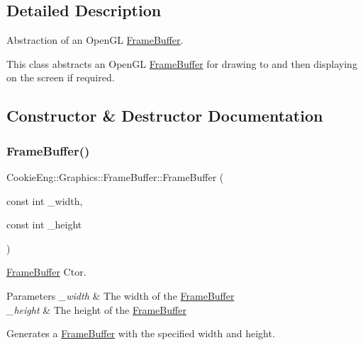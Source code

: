 \subsection{Detailed Description}
Abstraction of an Open\+GL \hyperlink{class_cookie_eng_1_1_graphics_1_1_frame_buffer}{Frame\+Buffer}. 

This class abstracts an Open\+GL \hyperlink{class_cookie_eng_1_1_graphics_1_1_frame_buffer}{Frame\+Buffer} for drawing to and then displaying on the screen if required. 

\subsection{Constructor \& Destructor Documentation}
\mbox{\label{class_cookie_eng_1_1_graphics_1_1_frame_buffer_aebfd6fefe83f74d3b776f83a22a69477}} 
\subsubsection{\texorpdfstring{Frame\+Buffer()}{FrameBuffer()}}
{\footnotesize\ttfamily Cookie\+Eng\+::\+Graphics\+::\+Frame\+Buffer\+::\+Frame\+Buffer (\begin{DoxyParamCaption}\item[{const int}]{\+\_\+width,  }\item[{const int}]{\+\_\+height }\end{DoxyParamCaption})}



\hyperlink{class_cookie_eng_1_1_graphics_1_1_frame_buffer}{Frame\+Buffer} Ctor. 


\begin{DoxyParams}{Parameters}
{\em \+\_\+width} & The width of the \hyperlink{class_cookie_eng_1_1_graphics_1_1_frame_buffer}{Frame\+Buffer} \\
\hline
{\em \+\_\+height} & The height of the \hyperlink{class_cookie_eng_1_1_graphics_1_1_frame_buffer}{Frame\+Buffer}\\
\hline
\end{DoxyParams}
Generates a \hyperlink{class_cookie_eng_1_1_graphics_1_1_frame_buffer}{Frame\+Buffer} with the specified width and height. \mbox{\label{class_cookie_eng_1_1_graphics_1_1_frame_buffer_a51742a4a0c6beeaeb4c2f14c7c97c79a}} 
